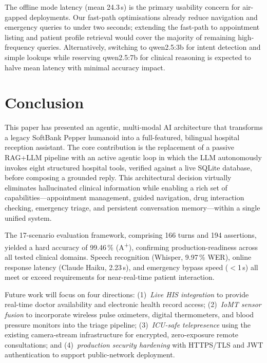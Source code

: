 \documentclass[conference]{IEEEtran}
\begin{document}
The offline mode latency (mean 24.3\,s) is the primary usability concern for
air-gapped deployments.
Our fast-path optimisations already reduce navigation and emergency queries to
under two seconds; extending the fast-path to appointment listing and patient
profile retrieval would cover the majority of remaining high-frequency queries.
Alternatively, switching to qwen2.5:3b for intent detection and simple lookups
while reserving qwen2.5:7b for clinical reasoning is expected to halve mean
latency with minimal accuracy impact.

\section{Conclusion}
\label{sec:conclusion}

This paper has presented an agentic, multi-modal AI architecture that transforms
a legacy SoftBank Pepper humanoid into a full-featured, bilingual hospital
reception assistant.
The core contribution is the replacement of a passive RAG+LLM pipeline with an
active agentic loop in which the LLM autonomously invokes eight structured
hospital tools, verified against a live SQLite database, before composing a
grounded reply.
This architectural decision virtually eliminates hallucinated clinical information
while enabling a rich set of capabilities—appointment management, guided
navigation, drug interaction checking, emergency triage, and persistent
conversation memory—within a single unified system.

The 17-scenario evaluation framework, comprising 166 turns and 194 assertions,
yielded a hard accuracy of 99.46\,\% (A\textsuperscript{+}), confirming
production-readiness across all tested clinical domains.
Speech recognition (Whisper, 9.97\,\% WER), online response latency (Claude
Haiku, 2.23\,s), and emergency bypass speed ($<$1\,s) all meet or exceed
requirements for near-real-time patient interaction.

Future work will focus on four directions:
(1)~\emph{Live HIS integration} to provide real-time doctor availability and
electronic health record access;
(2)~\emph{IoMT sensor fusion} to incorporate wireless pulse oximeters, digital
thermometers, and blood pressure monitors into the triage pipeline;
(3)~\emph{ICU-safe telepresence} using the existing camera-stream infrastructure
for encrypted, zero-exposure remote consultations;
and (4)~\emph{production security hardening} with HTTPS/TLS and JWT
authentication to support public-network deployment.
\end{document}
